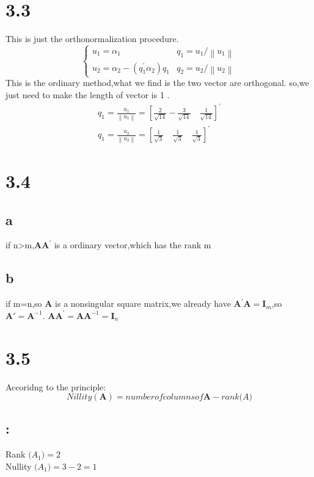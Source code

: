 \documentclass{article}
\newcommand{\rmnum}[1]{\romannumeral #1}
\begin{document}
\section*{3.3}
This is just the orthonormalization procedure.
$$
\left\{\begin{array}{ll}
u_{1}=\alpha_{1} & q_{1}=u_{1} /\left\|u_{1}\right\| \\
u_{2}=\alpha_{2}-\left(q_{1}^{\prime} \alpha_{2}\right) q_{1} & q_{2}=u_{2} /\left\|u_{2}\right\|
\end{array}\right.
$$
This is the ordinary method,what we find is the two vector are orthogonal. so,we just need to make the length of vector is 1 .
$$
\begin{array}{c}
q_{1}=\frac{u_{1}}{\left\|u_{1}\right\|}=\left[\frac{2}{\sqrt{14}}-\frac{3}{\sqrt{14}} \quad \frac{1}{\sqrt{14}}\right]^{\prime} \\
q_{1}=\frac{u_{2}}{\left\|u_{2}\right\|}=\left[\frac{1}{\sqrt{3}} \quad \frac{1}{\sqrt{3}} \quad \frac{1}{\sqrt{3}}\right]^{\prime}
\end{array}
$$

\section*{3.4}
\subsection*{a}
if n>m,$\boldsymbol{AA}^{'}$ is a ordinary vector,which has the rank m\\
\subsection*{b}
if m=n,so $\boldsymbol{A}$ is a nonsingular square matrix,we already have $\boldsymbol{A}^{'}\boldsymbol{A}=\boldsymbol{I}_m$,so $\boldsymbol{A}'=\boldsymbol{A}^{-1}$.
$\boldsymbol{AA}^{'}=\boldsymbol{A}\boldsymbol{A}^{-1}=\boldsymbol{I}_n$

\section*{3.5}
Accoridng to the principle:\\
\[Nillity(\boldsymbol{A})=number of columns of \boldsymbol{A}-rank\boldsymbol(A)\]
\subsection*{\rmnum{1}:}
Rank $\boldsymbol(A_1)=2$\\
Nullity $\boldsymbol(A_1)=3-2=1$
\end{document}
